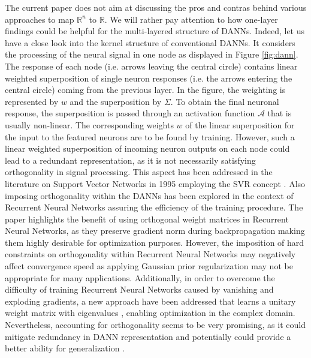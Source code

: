 \documentclass[a4paper,fleqn]{article}
\newcommand{\rw}[1]{\textcolor{blue}{#1}}
\newcommand{\del}[1]{\textcolor{red}{\sout{#1}}}
\renewcommand{\del}[1]{}
\renewcommand{\rw}[1]{#1}
\begin{document}
The current paper does not aim at discussing the pros and contras behind various approaches to map $\mathbb{R}^n$ to $\mathbb{R}$. We will rather pay attention to how one-layer findings could be helpful for the multi-layered structure of DANNs. Indeed, let us have a close look into the kernel structure of conventional DANNs. It considers the processing of the neural signal in one node as displayed in Figure \ref{fig:dann}. The response of each node (i.e. arrows leaving the central circle)  \del{is} contains linear weighted superposition of single neuron responses (i.e. the arrows entering the central circle) coming from the previous layer. In the figure, the weighting is represented by $w$ and the superposition by $\Sigma$. To obtain the final neuronal response, the superposition is passed through an activation function $\mathcal{A}$ that is usually non-linear. The corresponding weights $w$ of the linear superposition for the input to the featured neurons \del{is} \rw{are} to be found by training. However, such a linear weighted superposition of incoming neuron outputs on each node could lead to a redundant representation, as it is not necessarily satisfying orthogonality in signal processing. This aspect has been addressed in the literature on Support Vector Networks in 1995 \cite{cortes1995support} employing the SVR concept \cite{vapnik1974theory}. \rw{Also imposing orthogonality within the DANNs has been explored in the context of Recurrent Neural Networks \cite{mhammedi2017efficient} assuring the efficiency of the training procedure. The paper \cite{vorontsov2017orthogonality} highlights the benefit of using orthogonal weight matrices in Recurrent Neural Networks, as they preserve gradient norm during backpropagation making them highly desirable for optimization purposes. However, the imposition of hard constraints on orthogonality within Recurrent Neural Networks may negatively affect convergence speed \cite{vorontsov2017orthogonality} as applying Gaussian prior regularization may not be appropriate for many applications. Additionally, in order to overcome the difficulty of training Recurrent Neural Networks caused by vanishing and exploding gradients, a new approach have been addressed  that learns a unitary weight matrix with eigenvalues \cite{wisdom2016full,arjovsky2016unitary}, enabling optimization in the complex domain.} Nevertheless, accounting for orthogonality seems to be very promising, as it could mitigate redundancy in DANN representation \cite{wang2020orthogonal} and potentially could provide a better ability for generalization \cite{jia2019orthogonal}. 
\end{document}
